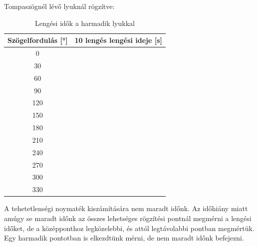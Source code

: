 \documentclass{article}
\begin{document}
Tompaszögnél lévő lyuknál rögzítve:

\begin{table}[H]
    \centering
    \begin{tabular}{|c|c|}
        \hline
        Szögelfordulás [°] & 10 lengés lengési ideje [s] \\ \hline
         0 &  \\ \hline 
         30 &  \\ \hline
         60 &  \\ \hline 
         90 &  \\ \hline
         120 &  \\ \hline 
         150 &  \\ \hline
         180 &  \\ \hline
         210 &  \\ \hline
         240 &  \\ \hline
         270 &  \\ \hline
         300 &  \\ \hline
         330 &  \\ \hline
        
    \end{tabular}
    \caption{Lengési idők a harmadik lyukkal}
    \label{tab:lengesiido_3.2}
\end{table}

A tehetetlenségi noymaték kiszámítására nem maradt időnk. Az időhiány miatt amúgy se maradt időnk az összes lehetséges rögzítési pontnál megmérni a lengési időket, de a középponthoz legközelebbi, és attól legtávolabbi pontban megmértük. Egy harmadik pontotban is elkezdtünk mérni, de nem maradt időnk befejezni.
\end{document}
